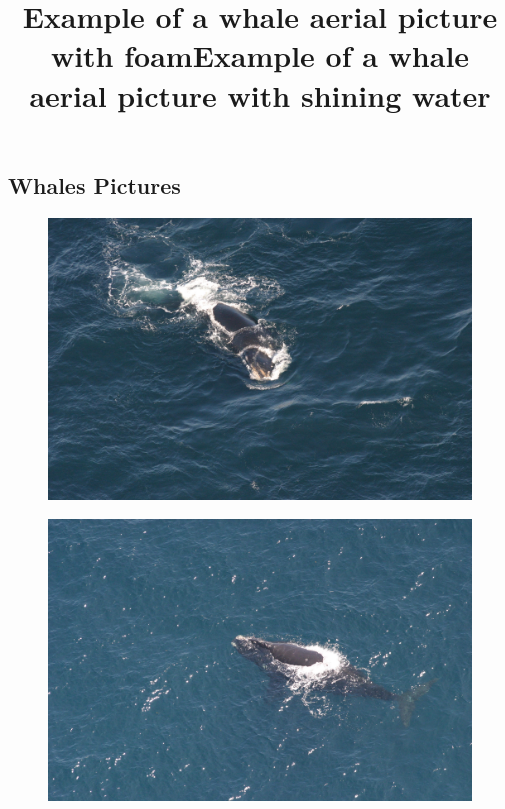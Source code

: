 \documentclass[11pt,a4paper,oneside]{report}
\begin{document}
\begin{appendices}
\chapter*{Whales Pictures}

\begin{figure}[H]
	\includegraphics[scale=0.1]{foam.jpg}
	\centering
	\title{Example of a whale aerial picture with foam}
\end{figure}

\begin{figure}[H]
	\includegraphics[scale=0.15]{water.jpg}
	\centering
	\title{Example of a whale aerial picture with shining water}
\end{figure}


\end{appendices}
\end{document}
